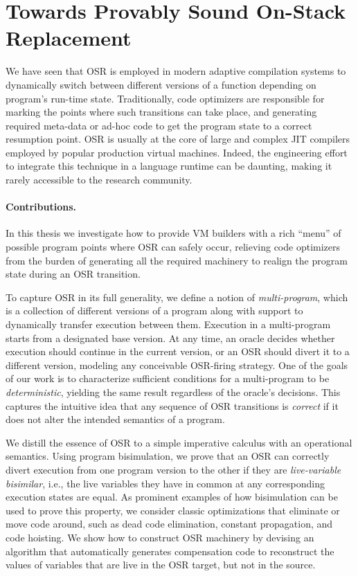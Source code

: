 \section{Towards Provably Sound On-Stack Replacement}
\label{se:osr-a-la-carte}

We have seen that OSR is employed in modern adaptive compilation systems to dynamically switch between different versions of a function depending on program's run-time state. Traditionally, code optimizers are responsible for marking the points where such transitions can take place, and generating required meta-data or ad-hoc code to get the program state to a correct resumption point. OSR is usually at the core of large and complex JIT compilers employed by popular production virtual machines. Indeed, the engineering effort to integrate this technique in a language runtime can be daunting, making it rarely accessible to the research community.

\paragraph*{Contributions.} In this thesis we investigate how to provide VM builders with a rich ``menu'' of possible program points where OSR can safely occur, relieving code optimizers from the burden of generating all the required machinery to realign the program state during an OSR transition.

To capture OSR in its full generality, we define a notion of {\em multi-program}, which is a collection of different versions of a program along with support to dynamically transfer execution between them. Execution in a multi-program starts from a designated base version. At any time, an oracle decides whether execution should continue in the current version, or an OSR should divert it to a different version, modeling any conceivable OSR-firing strategy. One of the goals of our work is to characterize sufficient conditions for a multi-program to be {\em deterministic}, yielding the same result regardless of the oracle's decisions. This captures the intuitive idea that any sequence of OSR transitions is {\em correct} if it does not alter the intended semantics of a program.

We distill the essence of OSR to a simple imperative calculus with an operational semantics. Using program bisimulation, we prove that an OSR can correctly divert execution from one program version to the other if they are {\em live-variable bisimilar}, i.e., the live variables they have in common at any corresponding execution states are equal. As prominent examples of how bisimulation can be used to prove this property, we consider classic optimizations that eliminate or move code around, such as dead code elimination, constant propagation, and code hoisting. We show how to construct OSR machinery by devising an algorithm that automatically generates compensation code to reconstruct the values of variables that are live in the OSR target, but not in the source.

